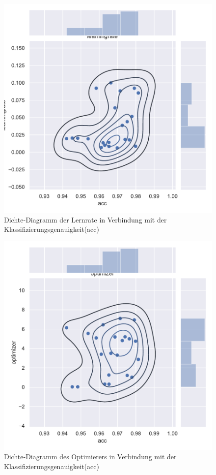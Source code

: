\begin{figure}[H]
  \centering  
  \includegraphics[scale=0.5]{anhang/GA_50_mnist_digits_False_small_jointplot_learningrate.pdf}
  \caption{Dichte-Diagramm der Lernrate in Verbindung mit der Klassifizierungsgenauigkeit(acc)}
  
\end{figure}

\begin{figure}[H]
  \centering  
  \includegraphics[scale=0.5]{anhang/GA_50_mnist_digits_False_small_jointplot_optimizer.pdf}
  \caption{Dichte-Diagramm des Optimierers in Verbindung mit der Klassifizierungsgenauigkeit(acc)}
  
\end{figure}

